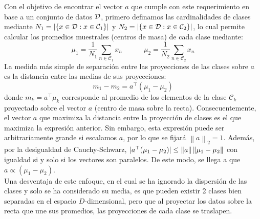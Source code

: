 Con el objetivo de encontrar el vector $a$ que cumple con este requerimiento en base a un conjunto de datos  ${\mathcal D}$, primero definamos las cardinalidades de clases mediante $N_1 = |\{x\in{\mathcal D}:x\in{\mathcal C}_1\}|$ y $N_2 = |\{x\in{\mathcal D}:x\in{\mathcal C}_2\}|$, lo cual permite calcular los promedios muestrales (centros de masa) de cada  clase mediante: 
\begin{equation}
	\mu_1=\frac{1}{N_1}\sum_{n\in\mathcal{C}_1}x_n
	\quad\quad\quad
	\mu_2=\frac{1}{N_2}\sum_{n\in\mathcal{C}_2}x_n
\end{equation}
La medida más simple de separación entre las proyecciones de las clases sobre $a$ es la distancia entre las medias  de sus proyecciones:
\begin{equation}
	m_1 - m_2 = a^\top(\mu_1-\mu_2)
\end{equation}
donde $m_k= a^\top\mu_k$ corresponde al promedio de los elementos de  la clase $\mathcal{C}_k$ proyectado sobre el  vector $a$ (centro de masa sobre la recta). Consecuentemente, el vector $a$ que maximiza la distancia entre la proyección de clases es el que maximiza la expresión anterior. Sin embargo, esta expresión puede ser arbitrariamente grande si escalamos $a$, por lo que se fijará $\left \| a \right \|_2=1$. Además, por la desigualdad de Cauchy-Schwarz, $|a^\top(\mu_1-\mu_2)|\leq \left\lVert a\right\rVert\left\lVert\mu_1-\mu_2\right\rVert$ con igualdad si y solo si los vectores son paralelos. De este modo, se llega a que $a\propto(\mu_1-\mu_2)$. \\

Una desventaja de este enfoque, en el cual se ha ignorado la dispersión de las clases y solo se ha considerado su media, es que pueden existir 2 clases bien separadas en el espacio $D$-dimensional, pero que al proyectar los datos sobre la recta que une sus promedios, las proyecciones de cada clase se traslapen. 

